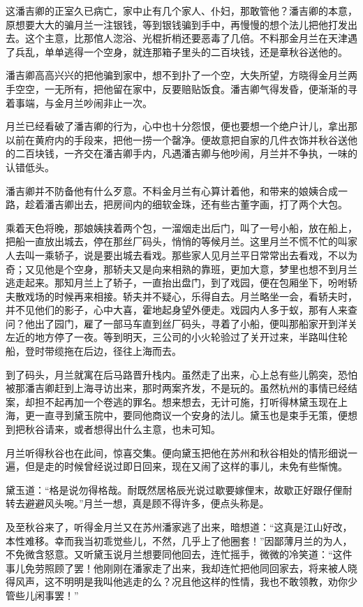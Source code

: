 \documentclass[12pt,UTF8]{ctexbook}
\begin{document}
{{{这潘吉卿的正室久已病亡，家中止有几个家人、仆妇，那敢管他？潘吉卿的本意，原想要大大的骗月兰一注银钱，等到银钱骗到手中，再慢慢的想个法儿把他打发出去。这个主意，比那倌人淴浴、光棍折梢还要恶毒了几倍。不料那金月兰在天津遇了兵乱，单单逃得一个空身，就连那箱子里头的二百块钱，还是章秋谷送他的。

潘吉卿高高兴兴的把他骗到家中，想不到扑了一个空，大失所望，方晓得金月兰两手空空，一无所有，把他留在家中，反要赔贴饭食。潘吉卿气得发昏，便渐渐的寻着事端，与金月兰吵闹非止一次。

月兰已经看破了潘吉卿的行为，心中也十分怨恨，便也要想一个绝户计儿，拿出那以前在黄府内的手段来，把他一捞一个罄净。便故意把自家的几件衣饰并秋谷送他的二百块钱，一齐交在潘吉卿手内，凡遇潘吉卿与他吵闹，月兰并不争执，一味的认错低头。

潘吉卿并不防备他有什么歹意。不料金月兰有心算计着他，和带来的娘姨合成一路，趁着潘吉卿出去，把房间内的细软金珠，还有些古董字画，打了两个大包。

乘着天色将晚，那娘姨挟着两个包，一溜烟走出后门，叫了一号小船，放在船上，把船一直放出城去，停在那丝厂码头，悄悄的等候月兰。这里月兰不慌不忙的叫家人去叫一乘轿子，说是要出城去看戏。那些家人见月兰平日常常出去看戏，不以为奇；又见他是个空身，那轿夫又是向来相熟的靠班，更加大意，梦里也想不到月兰逃走起来。那知月兰上了轿子，一直抬出盘门，到了戏园，便在包厢坐下，吩咐轿夫散戏场的时候再来相接。轿夫并不疑心，乐得自去。月兰略坐一会，看轿夫时，并不见他们的影子，心中大喜，霍地起身望外便走。戏园内人多于蚁，那有人来查问？他出了园门，雇了一部马车直到丝厂码头，寻着了小船，便叫那船家开到洋关左近的地方停了一夜。等到明天，三公司的小火轮验过了关开过来，半路叫住轮船，登时带缆拖在后边，径往上海而去。

到了码头，月兰就寓在后马路晋升栈内。虽然走了出来，心上总有些儿鹘突，恐怕被那潘吉卿赶到上海寻访出来，那时两案齐发，不是玩的。虽然杭州的事情已经结案，却担不起再加一个卷逃的罪名。想来想去，无计可施，打听得林黛玉现在上海，更一直寻到黛玉院中，要同他商议一个安身的法儿。黛玉也是束手无策，便想到把秋谷请来，或者想得出什么主意，也未可知。

月兰听得秋谷也在此间，惊喜交集。便向黛玉把他在苏州和秋谷相处的情形细说一遍，但是走的时候曾经说过即日回来，现在又闹了这样的事儿，未免有些惭愧。

黛玉道：“格是说勿得格哉。耐既然居格辰光说过歇要嫁俚末，故歇正好跟仔俚耐转去避避风头啘。”月兰一想，真是顾不得许多，便点头称是。

及至秋谷来了，听得金月兰又在苏州潘家逃了出来，暗想道：“这真是江山好改，本性难移。幸而我当初乖觉些儿，不然，几乎上了他圈套！”因鄙薄月兰的为人，不免微含怒意。又听黛玉说月兰想要同他回去，连忙摇手，微微的冷笑道：“这件事儿免劳照顾了罢！他刚刚在潘家走了出来，我却连忙把他同回家去，将来被人晓得风声，这不明明是我叫他逃走的么？况且他这样的性情，我也不敢领教，劝你少管些儿闲事罢！”

}}}
\end{document}
